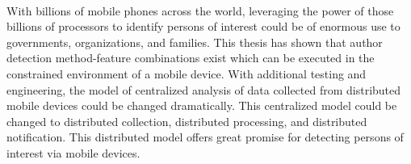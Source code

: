 \paragraph*{} With billions of mobile phones across the world, leveraging the power of those billions of processors to identify persons of interest could be of enormous use to governments, organizations, and families.  This thesis has shown that author detection method-feature combinations exist which can be executed in the constrained environment of a mobile device.  With additional testing and engineering, the model of centralized analysis of data collected from distributed mobile devices could be changed dramatically.  This centralized model could be changed to distributed collection, distributed processing, and distributed notification.  This distributed model offers great promise for detecting persons of interest via mobile devices.

